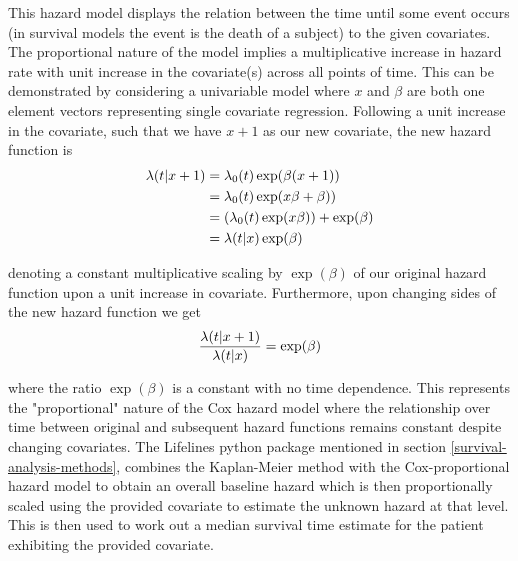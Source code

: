 \documentclass{l4proj}
\begin{document}
This hazard model displays the relation between the time until some event occurs (in survival models the event is the death of a subject) to the given covariates. The proportional nature of the model implies a multiplicative increase in hazard rate with unit increase in the covariate(s) across all points of time. This can be demonstrated by considering a univariable model where \(x\) and \(\beta\) are both one element vectors representing single covariate regression. Following a unit increase in the covariate, such that we have \(x + 1\) as our new covariate, the new hazard function is
\begin{equation}
    \centering
    \begin{aligned}
        \lambda (t | x + 1) ={}& \lambda_0 (t) \exp (\beta (x+1)) \\
                            ={}& \lambda_0 (t) \exp (x\beta  + \beta)) \\
                            ={}& (\lambda_0 (t) \exp (x\beta)) + \exp (\beta) \\
                            ={}& \lambda (t | x ) \exp (\beta)
    \end{aligned}
\end{equation}

denoting a constant multiplicative scaling by \(\exp (\beta)\) of our original hazard function upon a unit increase in covariate. Furthermore, upon changing sides of the new hazard function we get
\begin{equation}
    \centering
    \begin{aligned}
        \frac{\lambda (t | x + 1)}{\lambda (t | x )} = \exp (\beta) 
    \end{aligned}
\end{equation}

where the ratio \(\exp (\beta)\) is a constant with no time dependence. This represents the "proportional" nature of the Cox hazard model where the relationship over time between original and subsequent hazard functions remains constant despite changing covariates. The Lifelines python package mentioned in section \ref{survival-analysis-methods}, combines the Kaplan-Meier method with the Cox-proportional hazard model to obtain an overall baseline hazard which is then proportionally scaled using the provided covariate to estimate the unknown hazard at that level. This is then used to work out a median survival time estimate for the patient exhibiting the provided covariate.
\end{document}
